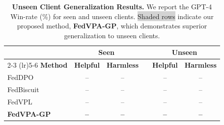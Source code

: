 \begin{table}[t]
\caption{\textbf{Unseen Client Generalization Results.} We report the GPT-4 Win-rate (\%) for seen and unseen clients. \colorbox{lightgray}{Shaded rows} indicate our proposed method, \textbf{FedVPA-GP}, which demonstrates superior generalization to unseen clients.}
\label{tab:unseen}
\vskip 0.15in
\begin{center}
\footnotesize
\renewcommand{\arraystretch}{1.1}
\setlength{\tabcolsep}{4pt}
\begin{tabular}{lccccc}
\toprule
& \multicolumn{2}{c}{\textbf{Seen}} & & \multicolumn{2}{c}{\textbf{Unseen}} \\
\cmidrule(lr){2-3} \cmidrule(lr){5-6}
\textbf{Method} & \textbf{Helpful} & \textbf{Harmless} & & \textbf{Helpful} & \textbf{Harmless} \\
\midrule
FedDPO      & -- & -- & & -- & -- \\
FedBiscuit  & -- & -- & & -- & -- \\
FedVPL      & -- & -- & & -- & -- \\
\rowcolor{lightgray}
\textbf{FedVPA-GP} & \textbf{--} & \textbf{--} & & \textbf{--} & \textbf{--} \\
\bottomrule
\end{tabular}
\end{center}
\vskip -0.1in
\end{table}
